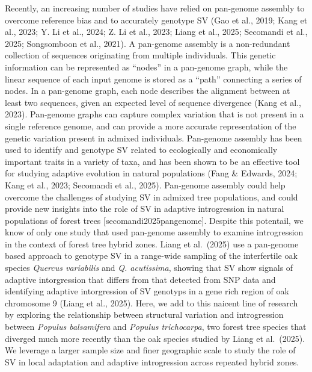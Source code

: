 \documentclass[
]{agujournal2019}
\begin{document}
Recently, an increasing number of studies have relied on pan-genome
assembly to overcome reference bias and to accurately genotype SV (Gao
et al., 2019; Kang et al., 2023; Y. Li et al., 2024; Z. Li et al., 2023;
Liang et al., 2025; Secomandi et al., 2025; Songsomboon et al., 2021). A
pan-genome assembly is a non-redundant collection of sequences
originating from multiple individuals. This genetic information can be
represented as ``nodes'' in a pan-genome graph, while the linear
sequence of each input genome is stored as a ``path'' connecting a
series of nodes. In a pan-genome graph, each node describes the
alignment between at least two sequences, given an expected level of
sequence divergence (Kang et al., 2023). Pan-genome graphs can capture
complex variation that is not present in a single reference genome, and
can provide a more accurate representation of the genetic variation
present in admixed individuals. Pan-genome assembly has been used to
identify and genotype SV related to ecologically and economically
important traits in a variety of taxa, and has been shown to be an
effective tool for studying adaptive evolution in natural populations
(Fang \& Edwards, 2024; Kang et al., 2023; Secomandi et al., 2025).
Pan-genome assembly could help overcome the challenges of studying SV in
admixed tree populations, and could provide new insights into the role
of SV in adaptive introgression in natural populations of forest trees
{[}secomandi2025pangenome{]}. Despite this potentail, we know of only
one study that used pan-genome assembly to examine introgression in the
context of forest tree hybrid zones. Liang et al.~(2025) use a
pan-genome based approach to genotype SV in a range-wide sampling of the
interfertile oak species \emph{Quercus variabilis} and \emph{Q.
acutissima}, showing that SV show signals of adaptive intorgression that
differs from that detected from SNP data and identifying adaptive
intorgression of SV genotyps in a gene rich region of oak chromosome 9
(Liang et al., 2025). Here, we add to this naicent line of research by
exploring the relationship between structural variation and
introgression between \emph{Populus balsamifera} and \emph{Populus
trichocarpa}, two forest tree species that diverged much more recently
than the oak species studied by Liang et al.~(2025). We leverage a
larger sample size and finer geographic scale to study the role of SV in
local adaptation and adaptive introgression across repeated hybrid
zones.
\end{document}
